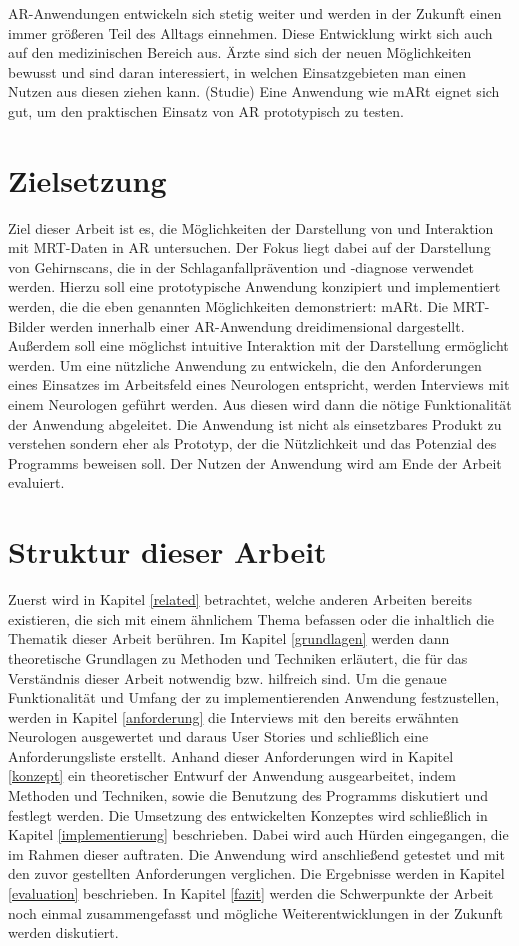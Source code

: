 AR-Anwendungen entwickeln sich stetig weiter und werden in der Zukunft einen immer größeren Teil des Alltags einnehmen. Diese Entwicklung wirkt sich auch auf den medizinischen Bereich aus. 
Ärzte sind sich der neuen Möglichkeiten bewusst und sind daran interessiert, 
in welchen Einsatzgebieten man einen Nutzen aus diesen ziehen kann. (Studie)
Eine Anwendung wie mARt eignet sich gut, um den praktischen Einsatz von AR prototypisch zu testen.

\section{Zielsetzung}

Ziel dieser Arbeit ist es, die Möglichkeiten der Darstellung von und Interaktion mit MRT-Daten in AR untersuchen. Der Fokus liegt dabei auf der Darstellung von Gehirnscans, die in der Schlaganfallprävention und -diagnose verwendet werden.
Hierzu soll eine prototypische Anwendung konzipiert und implementiert werden, die die eben genannten Möglichkeiten demonstriert: mARt.
Die MRT-Bilder werden innerhalb einer AR-Anwendung dreidimensional dargestellt. Außerdem soll eine möglichst intuitive Interaktion mit der Darstellung ermöglicht werden. 
Um eine nützliche Anwendung zu entwickeln, die den Anforderungen eines Einsatzes im Arbeitsfeld eines Neurologen entspricht, werden Interviews mit einem Neurologen geführt werden. Aus diesen wird dann die nötige Funktionalität der Anwendung abgeleitet. 
Die Anwendung ist nicht als einsetzbares Produkt zu verstehen sondern eher als Prototyp, der die Nützlichkeit und das Potenzial des Programms beweisen soll. Der Nutzen der Anwendung wird am Ende der Arbeit evaluiert.


\section{Struktur dieser Arbeit}

Zuerst wird in Kapitel \ref{related} betrachtet, welche anderen Arbeiten bereits existieren, die sich mit einem ähnlichem Thema befassen oder die inhaltlich die Thematik dieser Arbeit berühren. 
Im Kapitel \ref{grundlagen} werden dann theoretische Grundlagen zu Methoden und Techniken erläutert, die für das Verständnis dieser Arbeit notwendig bzw. hilfreich sind.
Um die genaue Funktionalität und Umfang der zu implementierenden Anwendung festzustellen, werden in Kapitel \ref{anforderung} die Interviews mit den bereits erwähnten Neurologen ausgewertet und daraus User Stories und schließlich eine Anforderungsliste erstellt.
Anhand dieser Anforderungen wird in Kapitel \ref{konzept} ein theoretischer Entwurf der Anwendung ausgearbeitet, indem Methoden und Techniken, sowie die Benutzung des Programms diskutiert und festlegt werden.
Die Umsetzung des entwickelten Konzeptes wird schließlich in Kapitel \ref{implementierung} beschrieben. Dabei wird auch Hürden eingegangen, die im Rahmen dieser auftraten.
Die Anwendung wird anschließend getestet und mit den zuvor gestellten Anforderungen verglichen. Die Ergebnisse werden in Kapitel \ref{evaluation} beschrieben. 
In Kapitel \ref{fazit} werden die Schwerpunkte der Arbeit noch einmal zusammengefasst und mögliche Weiterentwicklungen in der Zukunft werden diskutiert. 
 